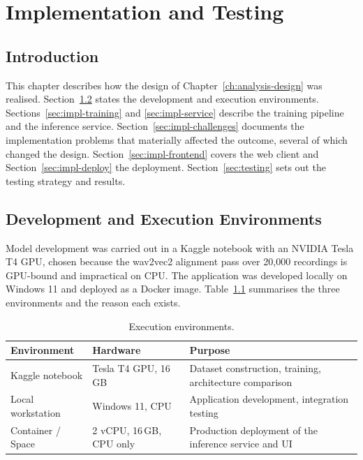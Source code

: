 \chapter{Implementation and Testing}
\label{ch:implementation}

\section{Introduction}

This chapter describes how the design of Chapter~\ref{ch:analysis-design} was
realised. Section~\ref{sec:impl-env} states the development and execution
environments. Sections~\ref{sec:impl-training} and \ref{sec:impl-service}
describe the training pipeline and the inference service.
Section~\ref{sec:impl-challenges} documents the implementation problems that
materially affected the outcome, several of which changed the design.
Section~\ref{sec:impl-frontend} covers the web client and
Section~\ref{sec:impl-deploy} the deployment. Section~\ref{sec:testing} sets out
the testing strategy and results.

\section{Development and Execution Environments}
\label{sec:impl-env}

Model development was carried out in a Kaggle notebook with an NVIDIA Tesla T4
GPU, chosen because the wav2vec2 alignment pass over 20{,}000 recordings is
GPU-bound and impractical on CPU. The application was developed locally on
Windows 11 and deployed as a Docker image. Table~\ref{tab:environments}
summarises the three environments and the reason each exists.

\begin{table}[H]
\centering
\caption[Execution environments]{Execution environments.}
\label{tab:environments}
\small
\begin{tabularx}{\textwidth}{@{}p{2.6cm}p{3.6cm}X@{}}
\toprule
\textbf{Environment} & \textbf{Hardware} & \textbf{Purpose} \\
\midrule
Kaggle notebook & Tesla T4 GPU, 16\,GB & Dataset construction, training, architecture comparison \\
Local workstation & Windows 11, CPU & Application development, integration testing \\
Container / Space & 2 vCPU, 16\,GB, CPU only & Production deployment of the inference service and UI \\
\bottomrule
\end{tabularx}
\end{table}

